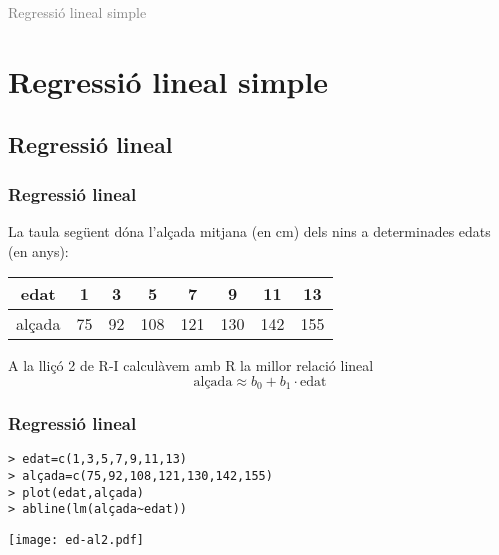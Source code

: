 \documentclass[12pt,t]{beamer}
\title[\red{Matemàtiques III}]{}
\author[]{}
\date{}
\newcommand{\gray}[1]{\textcolor{gray}{#1}}
\theoremstyle{plain}
\theoremstyle{definition}
\begin{document}
\beamertemplatedotitem

\lstset{breaklines=true}
\lstset{basicstyle=\ttfamily}


\begin{frame}
\vfill
\begin{center}
\gray{\LARGE Regressió lineal simple}
\end{center}
\vfill
\end{frame}


\section{Regressió lineal simple}
\subsection{Regressió lineal}

\begin{frame}
\frametitle{Regressió lineal}

La taula següent dóna l'alçada mitjana (en cm) dels nins a determinades edats (en anys):
\begin{center}
\begin{tabular}{c|ccccccc}
\hline
edat & 1 & 3 & 5 & 7 & 9 & 11 & 13\\
\hline
alçada & 75 & 92 & 108 & 121 & 130 & 142 & 155\\
\hline
\end{tabular}
\end{center}
A la lliçó 2 de R-I calculàvem amb R la millor relació lineal
$$
\mbox{alçada}\approx b_0+b_1\cdot\mbox{edat}
$$ 
\end{frame}



\begin{frame}[fragile]
\frametitle{Regressió lineal}
\vspace*{-2ex}

\begin{verbatim}
> edat=c(1,3,5,7,9,11,13)
> alçada=c(75,92,108,121,130,142,155)
> plot(edat,alçada)
> abline(lm(alçada~edat))
\end{verbatim}
\vspace*{-4ex}

\begin{center}
\texttt{[image: ed-al2.pdf]}
\end{center}
\end{frame}
\end{document}
